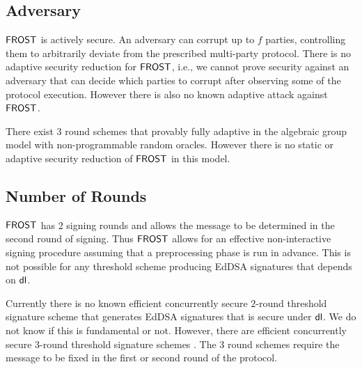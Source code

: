
\subsection{Adversary}\label{section:comparisons:adversary}
$\mathsf{FROST}$ is actively secure.  An adversary can corrupt up to $f$ parties, controlling them to arbitrarily deviate from the prescribed multi-party protocol.
There is no adaptive security reduction for $\mathsf{FROST}$, i.e., we cannot prove security against an adversary that can decide which parties to corrupt after observing some of the protocol execution.
However there is also no known adaptive attack against $\mathsf{FROST}$.


There exist $3$ round schemes that provably fully adaptive \cite{} in the algebraic group model with non-programmable random oracles.  However there is no static or adaptive security reduction of $\mathsf{FROST}$ in this model.

\subsection{Number of Rounds}\label{section:comparisons:rounds}
$\mathsf{FROST}$ has $2$ signing rounds and allows the message to be determined in the second round of signing.
Thus $\mathsf{FROST}$ allows for an effective non-interactive signing procedure assuming that a preprocessing phase is run in advance.
This is not possible for any threshold scheme producing EdDSA signatures that depends on $\mathsf{dl}$.

Currently there is no known efficient concurrently secure $2$-round threshold signature scheme that generates EdDSA signatures that is secure under $\mathsf{dl}$.
We do not know if this is fundamental or not.  However, there are efficient concurrently secure $3$-round threshold signature schemes \cite{Lindell22,Makriyannis22,CritesKM23}.
The $3$ round schemes require the message to be fixed in the first or second round of the protocol.


